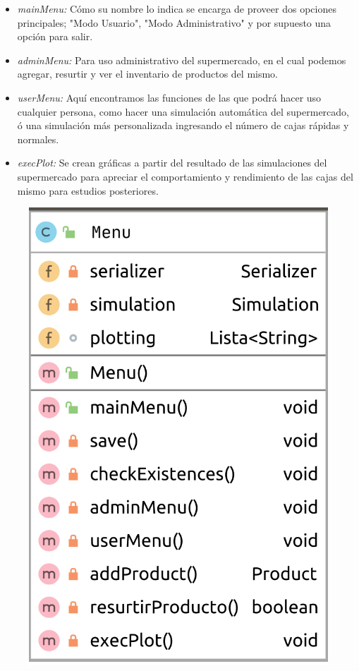 \documentclass[letterpaper,11pt]{article}
\begin{document}
\begin{itemize}
	\item \textit{mainMenu: } Cómo su nombre lo indica se encarga de proveer dos opciones principales; "Modo Usuario", "Modo Administrativo" y por supuesto una opción para salir.
\end{itemize}
\begin{itemize}
	\item \textit{adminMenu:} Para uso administrativo del supermercado, en el cual podemos agregar, resurtir y ver el inventario de productos del mismo.
\end{itemize}
\begin{itemize}
	\item \textit{userMenu: } Aquí encontramos las funciones de las que podrá hacer uso cualquier persona, como hacer una simulación automática del supermercado, ó una simulación más personalizada ingresando el número de cajas rápidas y normales.
\end{itemize}
\begin{itemize}
	\item \textit{execPlot: } Se crean gráficas a partir del resultado de las simulaciones del supermercado para apreciar el comportamiento y rendimiento de las cajas del mismo para estudios posteriores.
\end{itemize}
\begin{figure}[htb]
	\centering
	\includegraphics[scale=.29]{menu_diagram.png}
\end{figure}
\end{document}
